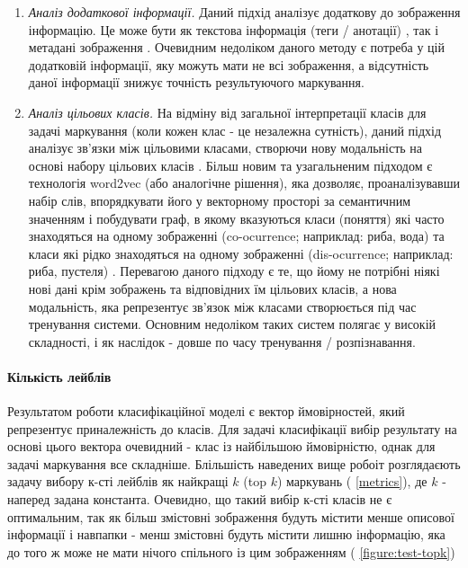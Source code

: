 \documentclass{udstu}
\begin{document}
\begin{enumerate}
	\item \textit{Аналіз додаткової інформації.}
	Даний підхід аналізує додаткову до зображення інформацію.
	Це може бути як текстова інформація (теги / анотації) \cite{cnn-sinn,sr-cnn-rnn},
	так і метадані зображення \cite{cnn-neighbors,cnn-location}.
	Очевидним недоліком даного методу є потреба у цій додатковій інформації,
	яку можуть мати не всі зображення, а відсутність даної інформації
	знижує точність результуючого маркування.

	\item \textit{Аналіз цільових класів.}
	На відміну від загальної інтерпретації класів для задачі маркування
	(коли кожен клас - це незалежна сутність), даний підхід аналізує зв'язки між цільовими класами,
	створючи нову модальність на основі набору цільових класів \cite{srn}.
	Більш новим та узагальненим підходом є технологія word2vec (або аналогічне рішення), яка дозволяє,
	проаналізувавши набір слів, впорядкувати його у векторному просторі за семантичним значенням
	і побудувати граф, в якому вказуються класи (поняття) які часто знаходяться на одному зображенні
	(co-ocurrence; наприклад: риба, вода) та класи які рідко знаходяться
	на одному зображенні (dis-ocurrence; наприклад: риба, пустеля) \cite{q2l, cpsd, cma}.
	Перевагою даного підходу є те, що йому не потрібні ніякі нові дані крім зображень та
	відповідних їм цільових класів, а нова модальність, яка репрезентує зв'язок між класами
	створюється під час тренування системи. Основним недоліком таких систем полягає у
	високій складності, і як наслідок - довше по часу тренування / розпізнавання.
\end{enumerate}

\clearpage

\paragraph{\textbf{Кількість лейблів}\\}

Результатом роботи класифікаційної моделі є вектор ймовірностей, який репрезентує приналежність до класів.
Для задачі класифікації вибір результату на основі цього вектора очевидний - клас із найбільшою ймовірністю, однак
для задачі маркування все складніше.
Блільшість наведених вище робоіт розглядаєють задачу вибору к-сті лейблів як найкращі $k$ (top $k$) маркувань (\chaptername{ \ref{metrics}}),
де $k$ - наперед задана константа. Очевидно, що такий вибір к-сті класів не є оптимальним,
так як більш змістовні зображення будуть містити менше описової інформації і навпапки - менш змістовні будуть
містити лишню інформацію, яка до того ж може не мати нічого спільного із цим зображенням (\figurename{ \ref{figure:test-topk}})
\end{document}
